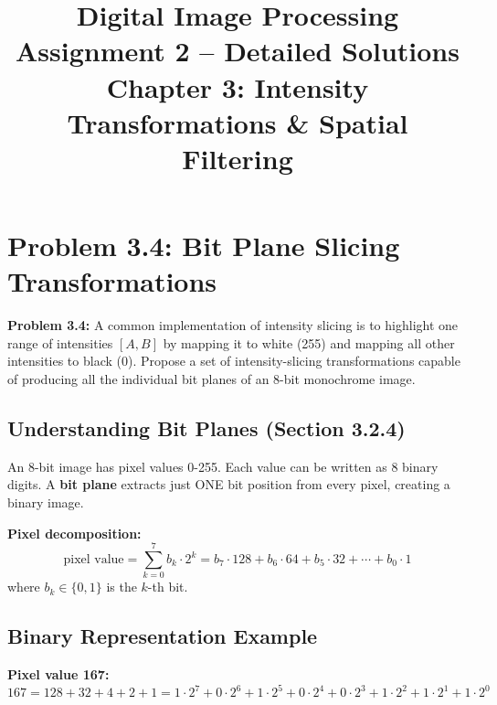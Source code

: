 \documentclass[12pt,a4paper]{article}
\title{\textbf{Digital Image Processing}\\Assignment 2 -- Detailed Solutions\\[0.5em]\large Chapter 3: Intensity Transformations \& Spatial Filtering}
\author{}
\date{}
\begin{document}
\maketitle
\tableofcontents
\newpage

\section{Problem 3.4: Bit Plane Slicing Transformations}

\begin{questionbox}
\textbf{Problem 3.4:} A common implementation of intensity slicing is to highlight one range of intensities $[A, B]$ by mapping it to white (255) and mapping all other intensities to black (0). Propose a set of intensity-slicing transformations capable of producing all the individual bit planes of an 8-bit monochrome image.
\end{questionbox}

\subsection{Understanding Bit Planes (Section 3.2.4)}

\begin{conceptbox}
An 8-bit image has pixel values 0-255. Each value can be written as 8 binary digits. A \textbf{bit plane} extracts just ONE bit position from every pixel, creating a binary image.

\textbf{Pixel decomposition:}
\[
\text{pixel value} = \sum_{k=0}^{7} b_k \cdot 2^k = b_7 \cdot 128 + b_6 \cdot 64 + b_5 \cdot 32 + \cdots + b_0 \cdot 1
\]
where $b_k \in \{0, 1\}$ is the $k$-th bit.
\end{conceptbox}

\subsection{Binary Representation Example}

\textbf{Pixel value 167:}
\[
167 = 128 + 32 + 4 + 2 + 1 = 1 \cdot 2^7 + 0 \cdot 2^6 + 1 \cdot 2^5 + 0 \cdot 2^4 + 0 \cdot 2^3 + 1 \cdot 2^2 + 1 \cdot 2^1 + 1 \cdot 2^0
\]
\end{document}
